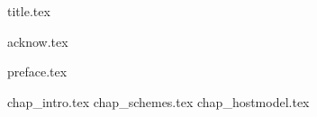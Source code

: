 \documentclass[12pt,letterpaper,oneside]{scrbook}
\begin{document}
\frontmatter
{title.tex}

\clearpage
\thispagestyle{empty}
{acknow.tex}

\tableofcontents

{preface.tex}

\mainmatter

{chap_intro.tex}
{chap_schemes.tex}
{chap_hostmodel.tex}

\appendix

\renewcommand{\thechapter}{\Alph{chapter}}

\backmatter
\end{document}
